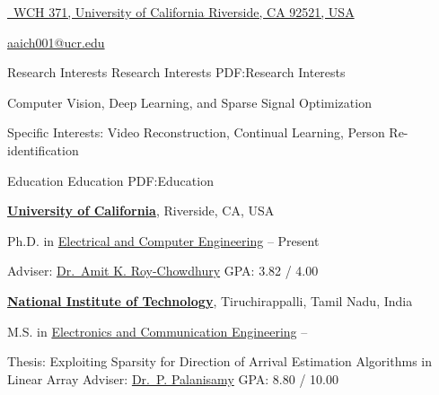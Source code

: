 \documentclass[letterpaper,MMMyyyy,nonstopmode]{simpleresumecv}
\newcommand{\CVAuthor}{Abhishek Aich}
\newcommand{\CVWebpage}{https://abhishekaich27.github.io}
\newcommand{\CVLinkedIn}{https://www.linkedin.com/in/abhishekaich27/}
\newcommand{\CVGitHub}{https://github.com/abhishekaich27}
\begin{document}

\Title{\CVAuthor}

\begin{SubTitle}
\href{https://goo.gl/maps/zEn5mL4zoZM2}
{\faMapMarker ~WCH 371, University of California Riverside, CA 92521, USA}
\par
\href{mailto:aaich001@ucr.edu}
{aaich001@ucr.edu}
\,\SubBulletSymbol\,
\href{\CVWebpage}
{\faHome}
\,\SubBulletSymbol\,
\href{\CVLinkedIn}
{\faLinkedinSquare}
\,\SubBulletSymbol\,
\href{\CVGitHub}
{\faGithubSquare}
\end{SubTitle}

\begin{Body}

\Section
{Research Interests}
{Research Interests}
{PDF:Research Interests}

\Entry
Computer Vision, Deep Learning, and Sparse Signal Optimization
\begin{Detail}
\SubBulletItem
Specific Interests: Video Reconstruction, Continual Learning, Person Re-identification
\end{Detail}
\BigGap

\Section
{Education}
{Education}
{PDF:Education}

\Entry
\href{http://www.ucr.edu}
{\textbf{University of California}},
Riverside, CA, USA

\Gap
\BulletItem
Ph.D. in
\href{https://www.ee.ucr.edu}
{Electrical and Computer Engineering}
\hfill
{}  --
Present
\begin{Detail}
\SubBulletItem
Adviser:
\href{https://www.engr.ucr.edu/people/amitroychowdhury.html}
{Dr.~Amit K. Roy-Chowdhury}
\SubBulletItem
GPA: 3.82 / 4.00
\end{Detail}

\BigGap
\Entry
\href{http://www.nitt.edu}
{\textbf{National Institute of Technology}},
Tiruchirappalli, Tamil Nadu, India

\Gap
\BulletItem
M.S. in
\href{https://www.nitt.edu/home/academics/departments/ece/}
{Electronics and Communication Engineering}
\hfill
{} --
\begin{Detail}
\SubBulletItem
Thesis:
Exploiting Sparsity for Direction of Arrival Estimation Algorithms in Linear Array
\SubBulletItem
Adviser:
\href{https://www.nitt.edu/home/academics/departments/ece/faculty/associate_professor/pp/}
{Dr.~P. Palanisamy}
\SubBulletItem
GPA: 8.80 / 10.00
\end{Detail}


\end{Body}
\end{document}
